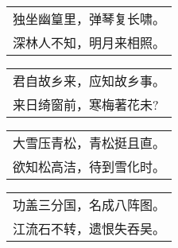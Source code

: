 \noindent\begin{minipage}{\linewidth}
  \vskip-3pt\begin{table}[H]
    \centering
    \begin{tabular}{@{}l@{}}
独坐幽篁里，弹琴复长啸。\\
深林人不知，明月来相照。
    \end{tabular}
  \end{table}
\end{minipage}
\vspace{1cm}


\noindent\begin{minipage}{\linewidth}
  \vskip-3pt\begin{table}[H]
    \centering
    \begin{tabular}{@{}l@{}}
君自故乡来，应知故乡事。\\
来日绮窗前，寒梅著花未?
    \end{tabular}
  \end{table}
\end{minipage}
\vspace{1cm}


\noindent\begin{minipage}{\linewidth}
  \vskip-3pt\begin{table}[H]
    \centering
    \begin{tabular}{@{}l@{}}
大雪压青松，青松挺且直。\\
欲知松高洁，待到雪化时。
    \end{tabular}
  \end{table}
\end{minipage}
\vspace{1cm}


\noindent\begin{minipage}{\linewidth}
  \vskip-3pt\begin{table}[H]
    \centering
    \begin{tabular}{@{}l@{}}
功盖三分国，名成八阵图。\\
江流石不转，遗恨失吞吴。
    \end{tabular}
  \end{table}
\end{minipage}
\vspace{1cm}


